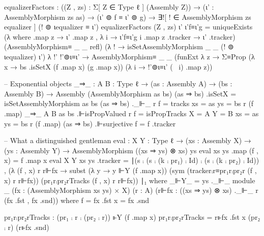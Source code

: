     equalizerFactors : ((Z , zs) : Σ[ Z ∈ Type ℓ ] (Assembly Z))
                     → (ι' : AssemblyMorphism zs as)
                     → (ι' ⊚ f ≡ ι' ⊚ g)
                     → ∃![ ! ∈ AssemblyMorphism zs equalizer ] (! ⊚ ιequalizer ≡ ι')
    equalizerFactors (Z , zs) ι' ι'f≡ι'g =
                     uniqueExists (λ where
                                     .map z → ι' .map z , λ i → ι'f≡ι'g i .map z
                                     .tracker → ι' .tracker)
                                     (AssemblyMorphism≡ _ _ refl)
                                     (λ ! → isSetAssemblyMorphism _ _ (! ⊚ ιequalizer) ι')
                                     λ !' !'⊚ι≡ι' → AssemblyMorphism≡ _ _
                                                    (funExt λ z → Σ≡Prop (λ x → bs .isSetX (f .map x) (g .map x))
                                                            (λ i → !'⊚ι≡ι' (~ i) .map z))

  -- Exponential objects
  _⇒_ : {A B : Type ℓ} → (as : Assembly A) → (bs : Assembly B) → Assembly (AssemblyMorphism as bs)
  (as ⇒ bs) .isSetX = isSetAssemblyMorphism as bs
  (as ⇒ bs) ._⊩_ r f = tracks {xs = as} {ys = bs} r (f .map)
  _⇒_ {A} {B} as bs .⊩isPropValued r f = isPropTracks {X = A} {Y = B} {xs = as} {ys = bs}  r (f .map)
  (as ⇒ bs) .⊩surjective f = f .tracker

  -- What a distinguished gentleman
  eval : {X Y : Type ℓ} → (xs : Assembly X) → (ys : Assembly Y) → AssemblyMorphism ((xs ⇒ ys) ⊗ xs) ys
  eval xs ys .map (f , x) = f .map x
  eval {X} {Y} xs ys .tracker =
       ∣(s ⨾ (s ⨾ (k ⨾ pr₁) ⨾ Id) ⨾ (s ⨾ (k ⨾ pr₂) ⨾ Id))
       , (λ (f , x) r r⊩fx → subst
               (λ y → y ⊩Y (f .map x))
               (sym (tracker⨾r≡pr₁r⨾pr₂r (f , x) r r⊩fx))
               (pr₁r⨾pr₂rTracks (f , x) r r⊩fx))
       ∣₁ where
          _⊩Y_ = ys ._⊩_
          module _ (fx : (AssemblyMorphism xs ys) × X)
                   (r : A)
                   (r⊩fx : ((xs ⇒ ys) ⊗ xs) ._⊩_ r (fx .fst , fx .snd)) where
            f = fx .fst
            x = fx .snd
                          
            pr₁r⨾pr₂rTracks : (pr₁ ⨾ r ⨾ (pr₂ ⨾ r)) ⊩Y (f .map x)
            pr₁r⨾pr₂rTracks = r⊩fx .fst x (pr₂ ⨾ r) (r⊩fx .snd)
                          
